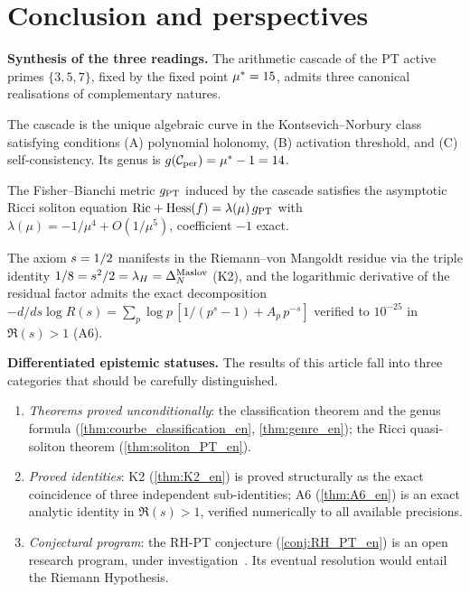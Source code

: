 \section{Conclusion and perspectives}
\label{sec:conclusion2}

\textbf{Synthesis of the three readings.} The arithmetic cascade of the PT active primes $\{3, 5, 7\}$, fixed by the fixed point $\mu^{*} = 15$, admits three canonical realisations of complementary natures.
\begin{description}[nosep,leftmargin=*]
\item[Algebro-geometric reading (\ref{sec:courbe}).] The cascade is the unique algebraic curve in the Kontsevich--Norbury class satisfying conditions (A) polynomial holonomy, (B) activation threshold, and (C) self-consistency. Its genus is $g(\mathcal{C}_{\rm per}) = \mu^{*} - 1 = 14$.
\item[Differential reading (\ref{sec:soliton}).] The Fisher--Bianchi metric $g_{\rm PT}$ induced by the cascade satisfies the asymptotic Ricci soliton equation $\mathrm{Ric} + \mathrm{Hess}(f) = \lambda(\mu)\, g_{\rm PT}$ with $\lambda(\mu) = -1/\mu^{4} + O(1/\mu^{5})$, coefficient $-1$ exact.
\item[Spectral reading (\ref{sec:spectrales}).] The axiom $s = 1/2$ manifests in the Riemann--von Mangoldt residue via the triple identity $1/8 = s^{2}/2 = \lambda_H = \Delta_N^{\rm Maslov}$ (K2), and the logarithmic derivative of the residual factor admits the exact decomposition $-d/ds \log R(s) = \sum_p \log p\,[1/(p^{s} - 1) + A_p\,p^{-s}]$ verified to $10^{-25}$ in $\Re(s) > 1$ (A6).
\end{description}

\textbf{Differentiated epistemic statuses.} The results of this article fall into three categories that should be carefully distinguished.
\begin{enumerate}[nosep,leftmargin=*]
\item \emph{Theorems proved unconditionally}: the classification theorem and the genus formula (\ref{thm:courbe_classification_en}, \ref{thm:genre_en}); the Ricci quasi-soliton theorem (\ref{thm:soliton_PT_en}).
\item \emph{Proved identities}: K2 (\ref{thm:K2_en}) is proved structurally as the exact coincidence of three independent sub-identities; A6 (\ref{thm:A6_en}) is an exact analytic identity in $\Re(s) > 1$, verified numerically to all available precisions.
\item \emph{Conjectural program}: the RH-PT conjecture (\ref{conj:RH_PT_en}) is an open research program, under investigation~\cite{PT_NewMath_Consolidation}. Its eventual resolution would entail the Riemann Hypothesis.
\end{enumerate}

